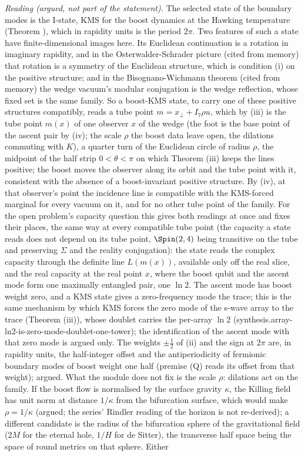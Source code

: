 \emph{Reading (argued, not part of the statement).} The selected state of the boundary modes is the I-state, KMS for the boost dynamics at the Hawking temperature (Theorem ), which in rapidity units is the period $2\pi$. Two features of such a state have finite-dimensional images here. Its Euclidean continuation is a rotation in imaginary rapidity, and in the Osterwalder-Schrader picture (cited from memory) that rotation is a symmetry of the Euclidean structure, which is condition (i) on the positive structure; and in the Bisognano-Wichmann theorem (cited from memory) the wedge vacuum's modular conjugation is the wedge reflection, whose fixed set is the same family. So a boost-KMS state, to carry one of these positive structures compatibly, reads a tube point $m = x_{\perp} + I_{7}\rho u$, which by (iii) is the tube point $m(x)$ of one observer $x$ of the wedge (the foot is the base point of the ascent pair by (iv); the scale $\rho$ the boost data leave open, the dilations commuting with $K$), a quarter turn of the Euclidean circle of radius $\rho$, the midpoint of the half strip $0 < \theta < \pi$ on which Theorem (iii) keeps the lines positive; the boost moves the observer along its orbit and the tube point with it, consistent with the absence of a boost-invariant positive structure. By (iv), at that observer's point the incidence line is compatible with the KMS-forced marginal for every vacuum on it, and for no other tube point of the family. For the open problem's capacity question this gives both readings at once and fixes their places, the same way at every compatible tube point (the capacity a state reads does not depend on its tube point, $\Spin(2,4)$ being transitive on the tube and preserving $\Sigma$ and the reality conjugation): the state reads the complex capacity through the definite line $L(m(x))$, available only off the real slice, and the real capacity at the real point $x$, where the boost qubit and the ascent mode form one maximally entangled pair, one $\ln 2$. The ascent mode has boost weight zero, and a KMS state gives a zero-frequency mode the trace; this is the same mechanism by which KMS forces the zero mode of the s-wave array to the trace (Theorem (iii)), whose doublet carries the per-array $\ln 2$ (synthesis.array-ln2-is-zero-mode-doublet-one-tower); the identification of the ascent mode with that zero mode is argued only. The weights $\pm\tfrac12$ of (ii) and the sign at $2\pi$ are, in rapidity units, the half-integer offset and the antiperiodicity of fermionic boundary modes of boost weight one half (premise (Q) reads its offset from that weight); argued. What the module does not fix is the scale $\rho$: dilations act on the family. If the boost flow is normalised by the surface gravity $\kappa$, the Killing field has unit norm at distance $1/\kappa$ from the bifurcation surface, which would make $\rho = 1/\kappa$ (argued; the series' Rindler reading of the horizon is not re-derived); a different candidate is the radius of the bifurcation sphere of the gravitational field ($2M$ for the eternal hole, $1/H$ for de Sitter), the transverse half space being the space of round metrics on that sphere. Either 